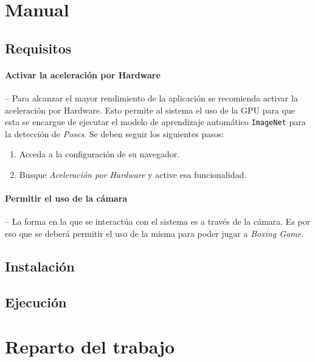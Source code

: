 \documentclass{article}
\begin{document}
\section{Manual}
\label{section:manual}

\subsection{Requisitos}

\paragraph{Activar la aceleración por Hardware} \mbox{} -- Para alcanzar el mayor rendimiento de la aplicación se recomienda activar la aceleración por Hardware. Esto permite al sistema el uso de la GPU para que esta se encargue de ejecutar el modelo de aprendizaje automático \texttt{ImageNet} para la detección de \textit{Poses}. Se deben seguir los siguientes pasos:

\begin{enumerate}
    \item Acceda a la configuración de su navegador.
    \item Busque \textit{Aceleración por Hardware} y active esa funcionalidad.
\end{enumerate}

\paragraph{Permitir el uso de la cámara} \mbox{} -- La forma en la que se interactúa con el sistema es a través de la cámara. Es por eso que se deberá permitir el uso de la misma para poder jugar a \textit{Boxing Game}.

\subsection{Instalación}

\subsection{Ejecución}

\section{Reparto del trabajo}
\label{section:work}
\end{document}
